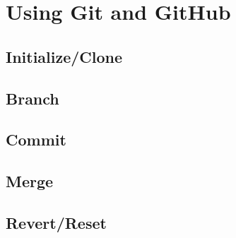 \documentclass{beamer}
\begin{document}
	\section{Using Git and GitHub}
		\subsection{Initialize/Clone}

		\subsection{Branch}

		\subsection{Commit}

		\subsection{Merge}

		\subsection{Revert/Reset}
\end{document}
